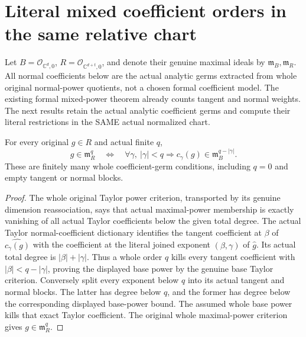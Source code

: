 \section{Literal mixed coefficient orders in the same relative chart}

Let $B=\mathcal O_{\mathbb C^d,0}$, $R=\mathcal O_{\mathbb C^{d+t},0}$,
and denote their genuine maximal ideals by $\mathfrak m_B,\mathfrak m_R$.
All normal coefficients below are the actual analytic germs extracted from
whole original normal-power quotients, not a chosen formal coefficient model.
The existing formal mixed-power theorem already counts tangent and normal
weights. The next results retain the actual analytic coefficient germs and
compute their literal restrictions in the SAME actual normalized chart.

\begin{theorem}
\label{hir:actual-mixed-analytic-coefficient-point-orders}
\leanok
For every original $g\in R$ and actual finite $q$,
\[
 g\in\mathfrak m_R^q\quad\Longleftrightarrow\quad
 \forall\gamma,\ |\gamma|<q\Longrightarrow
 c_\gamma(g)\in\mathfrak m_B^{q-|\gamma|}.
\]
These are finitely many whole coefficient-germ conditions, including $q=0$
and empty tangent or normal blocks.
\end{theorem}
\begin{proof}
The whole original Taylor power criterion, transported by its genuine dimension
reassociation, says that actual maximal-power membership is exactly vanishing
of all actual Taylor coefficients below the given total degree. The actual
Taylor normal-coefficient dictionary identifies the tangent coefficient at
$\beta$ of $\widehat{c_\gamma(g)}$ with the coefficient at the literal joined
exponent $(\beta,\gamma)$ of $\widehat g$. Its actual total degree is
$|\beta|+|\gamma|$. Thus a whole order $q$ kills every tangent coefficient
with $|\beta|<q-|\gamma|$, proving the displayed base power by the genuine
base Taylor criterion. Conversely split every exponent below $q$ into its
actual tangent and normal blocks. The latter has degree below $q$, and the
former has degree below the corresponding displayed base-power bound.
The assumed whole base power kills that exact Taylor coefficient. The original
whole maximal-power criterion gives $g\in\mathfrak m_R^q$.
\end{proof}

